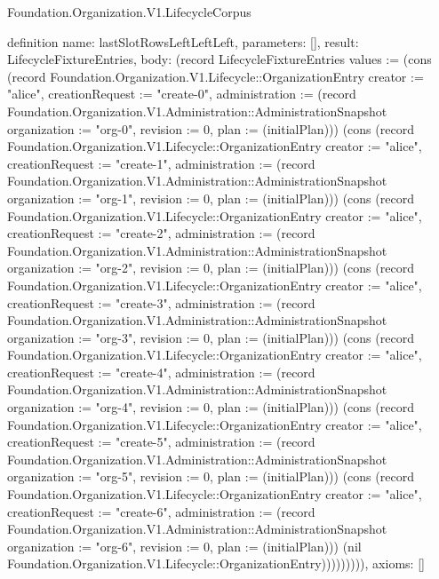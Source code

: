 \begin{lexlean}{Foundation.Organization.V1.LifecycleCorpus}
\begin{semanticmodule}
definition{
  name: lastSlotRowsLeftLeftLeft,
  parameters: [],
  result: LifecycleFixtureEntries,
  body: (record LifecycleFixtureEntries {values := (cons (record Foundation.Organization.V1.Lifecycle::OrganizationEntry {creator := "alice", creationRequest := "create-0", administration := (record Foundation.Organization.V1.Administration::AdministrationSnapshot {organization := "org-0", revision := 0, plan := (initialPlan)})}) (cons (record Foundation.Organization.V1.Lifecycle::OrganizationEntry {creator := "alice", creationRequest := "create-1", administration := (record Foundation.Organization.V1.Administration::AdministrationSnapshot {organization := "org-1", revision := 0, plan := (initialPlan)})}) (cons (record Foundation.Organization.V1.Lifecycle::OrganizationEntry {creator := "alice", creationRequest := "create-2", administration := (record Foundation.Organization.V1.Administration::AdministrationSnapshot {organization := "org-2", revision := 0, plan := (initialPlan)})}) (cons (record Foundation.Organization.V1.Lifecycle::OrganizationEntry {creator := "alice", creationRequest := "create-3", administration := (record Foundation.Organization.V1.Administration::AdministrationSnapshot {organization := "org-3", revision := 0, plan := (initialPlan)})}) (cons (record Foundation.Organization.V1.Lifecycle::OrganizationEntry {creator := "alice", creationRequest := "create-4", administration := (record Foundation.Organization.V1.Administration::AdministrationSnapshot {organization := "org-4", revision := 0, plan := (initialPlan)})}) (cons (record Foundation.Organization.V1.Lifecycle::OrganizationEntry {creator := "alice", creationRequest := "create-5", administration := (record Foundation.Organization.V1.Administration::AdministrationSnapshot {organization := "org-5", revision := 0, plan := (initialPlan)})}) (cons (record Foundation.Organization.V1.Lifecycle::OrganizationEntry {creator := "alice", creationRequest := "create-6", administration := (record Foundation.Organization.V1.Administration::AdministrationSnapshot {organization := "org-6", revision := 0, plan := (initialPlan)})}) (nil Foundation.Organization.V1.Lifecycle::OrganizationEntry))))))))}),
  axioms: []
}


\end{semanticmodule}
\end{lexlean}
